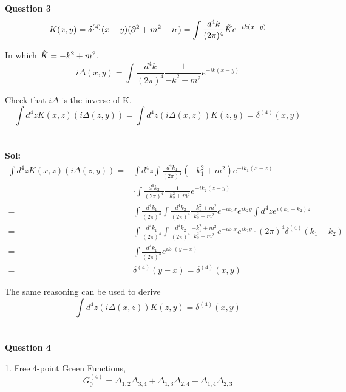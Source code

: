 \documentclass[a4paper]{article}
\begin{document}
\\
\\
\noindent \textbf{Question 3}
\begin{equation}
    K(x,y)=\delta^{(4)}(x-y)(\partial^2+m^2-i\epsilon)=\int{\frac{d^4k}{(2\pi)^4}\Tilde{K}e^{-ik(x-y)}}
\end{equation}
\par In which $\Tilde{K}=-k^2+m^2$.
\begin{equation}
    i\Delta(x,y)=\int{\frac{d^4k}{(2\pi)^4}\frac{1}{-k^2+m^2}e^{-ik(x-y)}}
\end{equation}
\par  Check that $i\Delta$ is the inverse of K.
\begin{equation}
    \int{d^4zK(x,z)(i\Delta(z,y))}=\int{d^4z(i\Delta(x,z))K(z,y)}=\delta^{(4)}(x,y)
\end{equation}
\\ \\
\textbf{Sol:}
\begin{equation}
\begin{split}
    \int{d^4zK(x,z)(i\Delta(z,y))}=&\int{d^4z}\int{\frac{d^4k_{1}}{(2\pi)^4}(-k_{1}^2+m^2)e^{-ik_{1}(x-z)}}\\
    &\cdot\int{\frac{d^4k_{2}}{(2\pi)^4}\frac{1}{-k_{2}^2+m^2}e^{-ik_{2}(z-y)}}\\
    =&\int{\frac{d^4k_{1}}{(2\pi)^4}}\int{\frac{d^4k_{2}}{(2\pi)^4}\frac{-k_{1}^2+m^2}{k_{2}^2+m^2}e^{-ik_{1}x}e^{ik_{2}y}}\int{d^4ze^{i(k_{1}-k_{2})z}}\\
    =&\int{\frac{d^4k_{1}}{(2\pi)^4}}\int{\frac{d^4k_{2}}{(2\pi)^4}\frac{-k_{1}^2+m^2}{k_{2}^2+m^2}e^{-ik_{1}x}e^{ik_{2}y}}\cdot(2\pi)^4\delta^{(4)}(k_{1}-k_{2})\\
    =&\int{\frac{d^4k_{1}}{(2\pi)^4}e^{ik_{1}(y-x)}}\\
    =&\delta^{(4)}(y-x)=\delta^{(4)}(x,y)
\end{split}
\end{equation}
\par The same reasoning can be used to derive
\begin{equation}
    \int{d^4z(i\Delta(x,z))K(z,y)}=\delta^{(4)}(x,y)
\end{equation}
\\
\\
\noindent \textbf{Question 4}
\par 1. Free 4-point Green Functions,
\begin{equation}
    G_{0}^{(4)}=\Delta_{1,2}\Delta_{3,4}+\Delta_{1,3}\Delta_{2,4}+\Delta_{1,4}\Delta_{2,3}
\end{equation}
\end{document}
